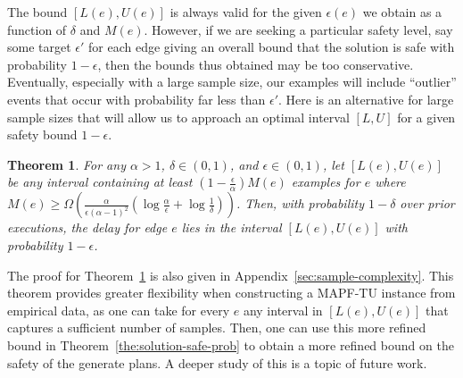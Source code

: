 \documentclass[jair,twoside,11pt,theapa]{article}
\newcommand{\mapftu}{MAPF-TU\xspace}
\newtheorem{theorem}{Theorem}
\begin{document}


The bound $[L(e),U(e)]$ is always valid for the given $\epsilon(e)$ we obtain as a function of $\delta$ and $M(e)$. 
However, if we are seeking a particular safety level, say some target $\epsilon'$ for each edge giving an overall bound that the solution is safe with probability $1-\epsilon$, then the bounds thus obtained may be too conservative. 
Eventually, especially with a large sample size, our examples will include ``outlier'' events that occur with probability far less than $\epsilon'$. Here is an alternative for large sample sizes that will allow us to approach an optimal interval $[L,U]$ for a given safety bound $1-\epsilon$.
\begin{theorem}\label{quantile-bound-thm}
For any $\alpha>1$, $\delta\in (0,1)$, and $\epsilon\in (0,1)$, let $[L(e),U(e)]$ be any interval containing at least $(1-\frac{\epsilon}{\alpha})M(e)$ examples for $e$ where $M(e)\geq \Omega(\frac{\alpha}{\epsilon(\alpha-1)^2}(\log\frac{\alpha}{\epsilon}+\log\frac{1}{\delta}))$. Then, with probability $1-\delta$ over prior executions, the delay for edge $e$ lies in the interval $[L(e),U(e)]$ with probability $1-\epsilon$.
\end{theorem}
The proof for Theorem~\ref{quantile-bound-thm} is also given in Appendix~\ref{sec:sample-complexity}. 
This theorem provides greater flexibility when constructing a \mapftu instance from empirical data, as one can take for every $e$ any interval in $[L(e),U(e)]$ that captures a sufficient number of samples. Then, one can use this more refined bound in Theorem~\ref{the:solution-safe-prob} to obtain a more refined bound on the safety of the generate plans. A deeper study of this is a topic of future work. 
\end{document}
